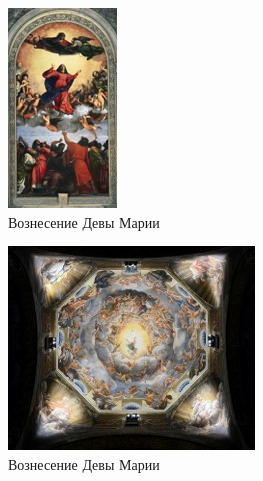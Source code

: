 \begin{figure}[ht]
    \centering
    \includegraphics{img/italiy/9.jpg}
    \caption{Вознесение Девы Марии}\label{fig:italy:9}
\end{figure}

\begin{figure}[ht]
    \centering
    \includegraphics{img/italiy/10.jpg}
    \caption{Вознесение Девы Марии}\label{fig:italy:10}
\end{figure}